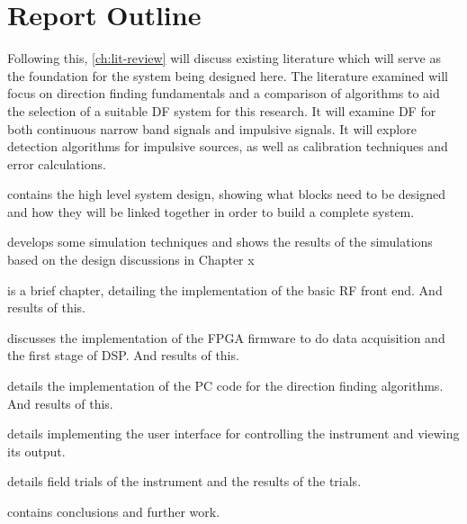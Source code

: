 \section{Report Outline}
Following this, \cref{ch:lit-review} will discuss existing literature which will serve as the foundation for the system being designed here. The literature examined will focus on direction finding fundamentals and a comparison of algorithms to aid the selection of a suitable DF system for this research. It will examine DF for both continuous narrow band signals and impulsive signals. It will explore detection algorithms for impulsive sources, as well as calibration techniques and error calculations.

 contains the high level system design, showing what blocks need to be designed and how they will be linked together in order to build a complete system.

 develops some simulation techniques and shows the results of the simulations based on the design discussions in Chapter x

 is a brief chapter, detailing the implementation of the basic RF front end. And results of this.

 discusses the implementation of the FPGA firmware to do data acquisition and the first stage of DSP. And results of this.

 details the implementation of the PC code for the direction finding algorithms. And results of this.

 details implementing the user interface for controlling the instrument and viewing its output.

 details field trials of the instrument and the results of the trials.

 contains conclusions and further work. 
